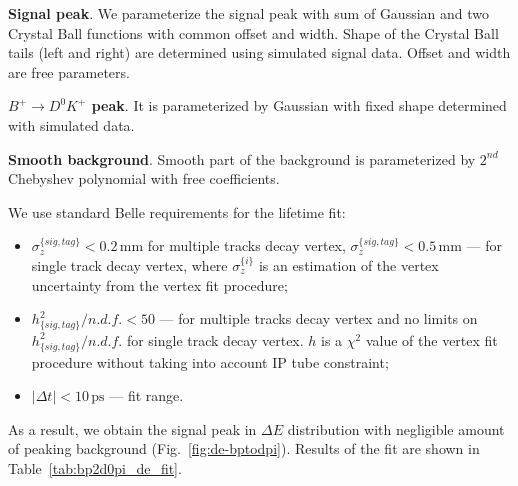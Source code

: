 \documentclass[preprint,aps,showpacs]{revtex4}
\begin{document}
{\bf Signal peak}. We parameterize the signal peak with sum of Gaussian and two Crystal Ball functions with common offset and width. Shape of the Crystal Ball tails (left and right) are determined using simulated signal data. Offset and width are free parameters.

{\bf $B^+\to D^0K^+$ peak}. It is parameterized by Gaussian with fixed shape determined with simulated data.

{\bf Smooth background}. Smooth part of the background is parameterized by $2^{nd}$ Chebyshev polynomial with free coefficients.

We use standard Belle requirements for the lifetime fit:
\begin{itemize}
 \item $\sigma^{\{sig,tag\}}_z<0.2\,\text{mm}$ for multiple tracks decay vertex, $\sigma^{\{sig,tag\}}_z<0.5\,\text{mm}$ --- for single track decay vertex, where $\sigma_z^{\{i\}}$ is an estimation of the vertex uncertainty from the vertex fit procedure;
 \item $h_{\{sig,tag\}}^2/n.d.f.<50$ --- for multiple tracks decay vertex and no limits on $h_{\{sig,tag\}}^2/n.d.f.$ for single track decay vertex. $h$ is a $\chi^2$ value of the vertex fit procedure without taking into account IP tube constraint;
 \item $\left|\Delta t\right|<10\,\text{ps}$ --- fit range.
\end{itemize}

As a result, we obtain the signal peak in $\Delta E$ distribution with negligible amount of peaking background (Fig.~\ref{fig:de-bptodpi}). Results of the fit are shown in Table~\ref{tab:bp2d0pi_de_fit}.
\end{document}
